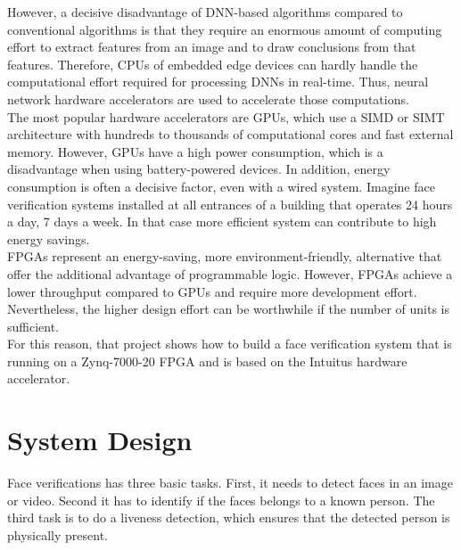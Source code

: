 \documentclass[%
a4paper,
twoside,
openany,
dvipsnames
]
{report}
\begin{document}
However, a decisive disadvantage of \gls{DNN}-based algorithms compared to conventional algorithms is that they require an enormous amount of computing effort to extract features from an image and to draw conclusions from that features. Therefore, \glspl{CPU} of embedded edge devices can hardly handle the computational effort required for processing \glspl{DNN} in real-time. Thus, neural network hardware accelerators are used to accelerate those computations.\\ 
The most popular hardware accelerators are \glspl{GPU}, which use a \gls{SIMD} or \gls{SIMT} architecture with hundreds to thousands of computational cores and fast external memory. However, \glspl{GPU} have a high power consumption, which is a disadvantage when using battery-powered devices. In addition, energy consumption is often a decisive factor, even with a wired system. Imagine face verification systems installed at all entrances of a building that operates 24 hours a day, 7 days a week. In that case more efficient system can contribute to high energy savings.\\
\Glspl{FPGA} represent an energy-saving, more environment-friendly, alternative that offer the additional advantage of programmable logic. However, \glspl{FPGA} achieve a lower throughput compared to \glspl{GPU} and require more development effort. Nevertheless, the higher design effort can be worthwhile if the number of units is sufficient.\\
For this reason, that project shows how to build a face verification system that is running on a Zynq-7000-20 \gls{FPGA} and is based on the Intuitus hardware accelerator.    
\chapter{System Design}
Face verifications has three basic tasks. First, it needs to detect faces in an image or video. Second it has to identify if the faces belongs to a known person. The third task is to do a liveness detection, which ensures that the detected person is physically present.  \\
\end{document}
